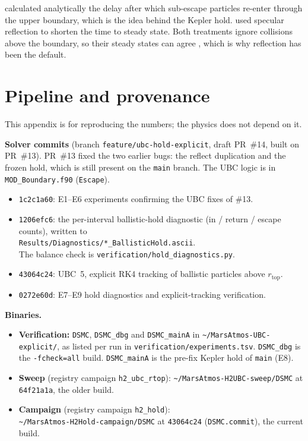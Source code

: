 \documentclass[10pt]{article}
\newcommand{\para}[1]{\textbf{#1}\hspace{0.5em}}
\newcommand{\rtop}{r_\mathrm{top}}
\begin{document}
{\small\color{graphite} \citet{merryfield94} calculated analytically the delay after which sub-escape particles re-enter through the upper boundary, which is the idea behind the Kepler hold. \citet{volkov11} used specular reflection to shorten the time to steady state. Both treatments ignore collisions above the boundary, so their steady states can agree \citep{cm21}, which is why reflection has been the default.}

\appendix
\renewcommand{\thesection}{\Alph{section}}
\renewcommand{\thefigure}{\Alph{section}\arabic{figure}}
\renewcommand{\thetable}{\Alph{section}\arabic{table}}
\setcounter{figure}{0}
\setcounter{table}{0}

\section{Pipeline and provenance}\label{app:pipeline}

This appendix is for reproducing the numbers; the physics does not depend on it.

\para{Solver commits} (branch \texttt{feature/ubc-hold-explicit}, draft PR~\#14, built on PR~\#13). PR~\#13 fixed the two earlier bugs: the reflect duplication and the frozen hold, which is still present on the \texttt{main} branch. The UBC logic is in \texttt{MOD\_Boundary.f90} (\texttt{Escape}).
\begin{itemize}
  \item \texttt{1c2c1a60}: E1–E6 experiments confirming the UBC fixes of \#13.
  \item \texttt{1206efc6}: the per-interval ballistic-hold diagnostic (in / return / escape counts), written to\\ \texttt{Results/Diagnostics/*\_BallisticHold.ascii}.\\ The balance check is \texttt{verification/hold\_diagnostics.py}.
  \item \texttt{43064c24}: UBC~5, explicit RK4 tracking of ballistic particles above $\rtop$.
  \item \texttt{0272e60d}: E7–E9 hold diagnostics and explicit-tracking verification.
\end{itemize}

\para{Binaries.}
\begin{itemize}
  \item \textbf{Verification:} \texttt{DSMC}, \texttt{DSMC\_dbg} and \texttt{DSMC\_mainA} in \texttt{\~{}/MarsAtmos-UBC-explicit/}, as listed per run in \texttt{verification/experiments.tsv}. \texttt{DSMC\_dbg} is the \texttt{-fcheck=all} build. \texttt{DSMC\_mainA} is the pre-fix Kepler hold of \texttt{main} (E8).
  \item \textbf{Sweep} (registry campaign \texttt{h2\_ubc\_rtop}): \texttt{\~{}/MarsAtmos-H2UBC-sweep/DSMC} at \texttt{64f21a1a}, the older build.
  \item \textbf{Campaign} (registry campaign \texttt{h2\_hold}):\\ \texttt{\~{}/MarsAtmos-H2Hold-campaign/DSMC} at \texttt{43064c24} (\texttt{DSMC.commit}), the current build.
\end{itemize}
\end{document}
